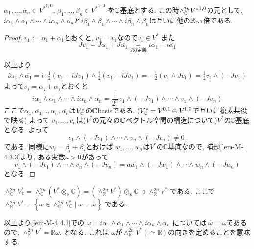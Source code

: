 \begin{tcolorbox}[mybox]
\begin{lem}
\label{lem-M-4.4.1}
$\alpha_1, \ldots, \alpha_n \in {V^{*}}^{1,0}$, $\beta_1, \ldots, \beta_n \in {V^{*}}^{1,0}$
を$\mathbb{C}$基底とする. 
この時$\wedge_{\mathbb{C}}^{2n}{V^{*}}^{1,0}$の元として, 
$i \alpha_1 \wedge \overline{\alpha_1} \wedge \cdots \wedge i \alpha_n\wedge \overline{\alpha_n}$と$i \beta_1 \wedge \overline{\beta_1} \wedge \cdots \wedge i \beta_n\wedge \overline{\beta_n}$は互いに他の$\mathbb{R}_{>0}$倍である. 
\end{lem}
\end{tcolorbox}
\begin{proof}
$v_1 := \alpha_1 + \overline{\alpha_1}$とおくと, 
$\overline{v_1}=v_1$なので$v_1 \in V^{*}$
また
$$
Jv_1=J\alpha_1 + J\overline{\alpha_1}\underset{\text{$J$の定義}}{=}
i\alpha_1 - i \overline{\alpha_1}
$$

以上より
\begin{align*}
i \alpha_1 \wedge \overline{\alpha_1}
=
i \cdot \frac{1}{2}(v_1 - i J v_1) 
\wedge \frac{i}{2}(v_1 + i J v_1) 
=
-\frac{1}{2}(v_1\wedge J v_1)
=
\frac{1}{2}v_1\wedge (-J v_1)
\end{align*}
よって$v_j = \alpha_j + \overline{\alpha_j}$とおくと
$$
i \alpha_1 \wedge \overline{\alpha_1} \wedge \cdots \wedge i \alpha_n\wedge \overline{\alpha_n}
= \frac{1}{2^n}
v_1\wedge (-J v_1) 
\wedge \cdots \wedge
v_n\wedge (-J v_n) 
$$
ここで$\alpha_1, \overline{\alpha_1}\ldots, \alpha_n, \overline{\alpha_n}$は$V_{\mathbb{C}}^{*}$の$\mathbb{C}$basisである. ($V_{\mathbb{C}}^{*}=V^{0,1}\oplus V^{1,0}$で互いに複素共役で映る)
よって
\(v_1,\ldots,v_n\)は($V^*$の元々の$\mathbb{C}$ベクトル空間の構造について)$V^*$の$ \mathbb{C}$基底となる.
よって
\[
v_1\wedge(-Jv_1)\wedge\cdots\wedge v_n\wedge(-Jv_n)\ne 0.
\]
である. 
同様に$w_i = \beta_i + \overline{\beta_i}$とおけば
\(w_1,\ldots,w_n\)は$V^*$の$\mathbb{C}$基底なので, 
補題\ref{lem-M-4.3.3}より, ある実数$a > 0$があって
\[
v_1\wedge(-Jv_1)\wedge\cdots\wedge v_n\wedge(-Jv_n)
=
aw_1\wedge(-Jw_1)\wedge\cdots\wedge w_n\wedge(-Jw_n)
\]
となる. 
\end{proof}

\begin{rem}
\(
\wedge_{\mathbb{C}}^{2n}V_{\mathbb{C}}^*
=
\wedge_{\mathbb{C}}^{2n}(V^*\otimes_{\mathbb{R}}\mathbb{C})
=
(\wedge_{\mathbb{R}}^{2n}V^*)\otimes_{\mathbb{R}}\mathbb{C}
\supset \wedge_{\mathbb{R}}^{2n}V^*
\)
である. 
ここで
\(
\wedge_{\mathbb{R}}^{2n}V^*
=
\left\{
\omega\in\wedge_{\mathbb{C}}^{2n}V_{\mathbb{C}}^*
\mid
\omega=\overline{\omega}
\right\}
\)
である.

以上より\ref{lem-M-4.4.1}での
\(
\omega
=
i\alpha_1\wedge\bar{\alpha}_1\wedge\cdots\wedge i\alpha_n\wedge\bar{\alpha}_n
\)
については
\(\overline{\omega}=\omega\)であるので, 
\(
\wedge_{\mathbb{R}}^{2n}V^*=\mathbb{R}\omega.
\)
となる. これは
$\omega$が$\wedge_{\mathbb{R}}^{2n}V^*(\simeq\mathbb{R})$の向きを定めることを意味する.

\end{rem}






